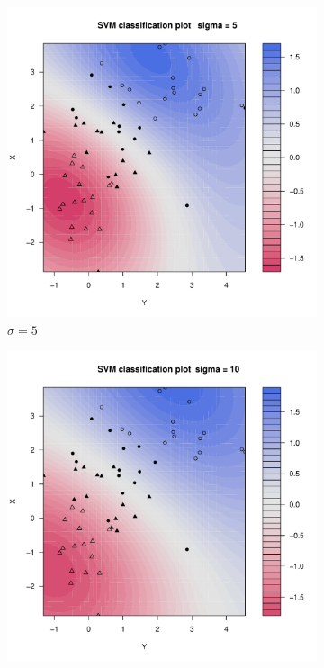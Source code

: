 \begin{figure}[H]
\begin{subfigure}{0.24\linewidth}
		\includegraphics[width=1\linewidth]{Graphics/Problema_01/Experiment_03_2.pdf}
		\caption{$\sigma=5$}
	\end{subfigure}
	\begin{subfigure}{0.24\linewidth}
		\includegraphics[width=1\linewidth]{Graphics/Problema_01/Experiment_03_3.pdf}

\end{subfigure}
\end{figure}
